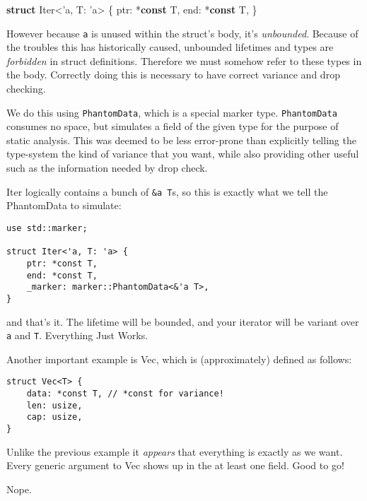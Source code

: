 \documentclass[a4paper,]{book}
\newenvironment{Shaded}{\begin{snugshade}}{\end{snugshade}}
\newcommand{\KeywordTok}[1]{\textcolor[rgb]{0.13,0.29,0.53}{\textbf{{#1}}}}
\newcommand{\OtherTok}[1]{\textcolor[rgb]{0.56,0.35,0.01}{{#1}}}
\newcommand{\NormalTok}[1]{{#1}}
\begin{document}
\begin{Shaded}
\begin{Highlighting}[]
\KeywordTok{struct} \NormalTok{Iter<}\OtherTok{'a}\NormalTok{, T: }\OtherTok{'a}\NormalTok{> \{}
    \NormalTok{ptr: *}\KeywordTok{const} \NormalTok{T,}
    \NormalTok{end: *}\KeywordTok{const} \NormalTok{T,}
\NormalTok{\}}
\end{Highlighting}
\end{Shaded}

However because \texttt{\textquotesingle{}a} is unused within the
struct's body, it's \emph{unbounded}. Because of the troubles this has
historically caused, unbounded lifetimes and types are \emph{forbidden}
in struct definitions. Therefore we must somehow refer to these types in
the body. Correctly doing this is necessary to have correct variance and
drop checking.

We do this using \texttt{PhantomData}, which is a special marker type.
\texttt{PhantomData} consumes no space, but simulates a field of the
given type for the purpose of static analysis. This was deemed to be
less error-prone than explicitly telling the type-system the kind of
variance that you want, while also providing other useful such as the
information needed by drop check.

Iter logically contains a bunch of \texttt{\&\textquotesingle{}a\ T}s,
so this is exactly what we tell the PhantomData to simulate:

\begin{verbatim}
use std::marker;

struct Iter<'a, T: 'a> {
    ptr: *const T,
    end: *const T,
    _marker: marker::PhantomData<&'a T>,
}
\end{verbatim}

and that's it. The lifetime will be bounded, and your iterator will be
variant over \texttt{\textquotesingle{}a} and \texttt{T}. Everything
Just Works.

Another important example is Vec, which is (approximately) defined as
follows:

\begin{verbatim}
struct Vec<T> {
    data: *const T, // *const for variance!
    len: usize,
    cap: usize,
}
\end{verbatim}

Unlike the previous example it \emph{appears} that everything is exactly
as we want. Every generic argument to Vec shows up in the at least one
field. Good to go!

Nope.
\end{document}

